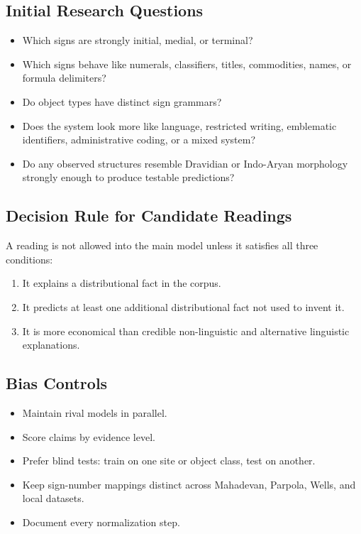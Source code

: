 \subsection{Initial Research Questions}

\begin{itemize}
  \item Which signs are strongly initial, medial, or terminal?
  \item Which signs behave like numerals, classifiers, titles, commodities, names, or formula delimiters?
  \item Do object types have distinct sign grammars?
  \item Does the system look more like language, restricted writing, emblematic identifiers, administrative coding, or a mixed system?
  \item Do any observed structures resemble Dravidian or Indo-Aryan morphology strongly enough to produce testable predictions?
\end{itemize}

\subsection{Decision Rule for Candidate Readings}

A reading is not allowed into the main model unless it satisfies all three conditions:

\begin{enumerate}
  \item It explains a distributional fact in the corpus.
  \item It predicts at least one additional distributional fact not used to invent it.
  \item It is more economical than credible non-linguistic and alternative linguistic explanations.
\end{enumerate}

\subsection{Bias Controls}

\begin{itemize}
  \item Maintain rival models in parallel.
  \item Score claims by evidence level.
  \item Prefer blind tests: train on one site or object class, test on another.
  \item Keep sign-number mappings distinct across Mahadevan, Parpola, Wells, and local datasets.
  \item Document every normalization step.
\end{itemize}

